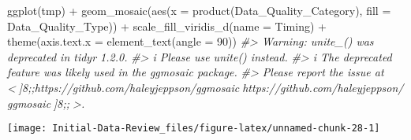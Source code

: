 \documentclass[
]{article}
\newenvironment{Shaded}{\begin{snugshade}}{\end{snugshade}}
\newcommand{\AttributeTok}[1]{\textcolor[rgb]{0.77,0.63,0.00}{#1}}
\newcommand{\CommentTok}[1]{\textcolor[rgb]{0.56,0.35,0.01}{\textit{#1}}}
\newcommand{\DecValTok}[1]{\textcolor[rgb]{0.00,0.00,0.81}{#1}}
\newcommand{\FunctionTok}[1]{\textcolor[rgb]{0.00,0.00,0.00}{#1}}
\newcommand{\NormalTok}[1]{#1}
\newcommand{\SpecialCharTok}[1]{\textcolor[rgb]{0.00,0.00,0.00}{#1}}
\newcommand{\StringTok}[1]{\textcolor[rgb]{0.31,0.60,0.02}{#1}}
\begin{document}
\begin{Shaded}
\begin{Highlighting}[]
\FunctionTok{ggplot}\NormalTok{(tmp) }\SpecialCharTok{+}
  \FunctionTok{geom\_mosaic}\NormalTok{(}\FunctionTok{aes}\NormalTok{(}\AttributeTok{x =} \FunctionTok{product}\NormalTok{(Data\_Quality\_Category), }
                  \AttributeTok{fill =}\NormalTok{ Data\_Quality\_Type)) }\SpecialCharTok{+}
  \FunctionTok{scale\_fill\_viridis\_d}\NormalTok{(}\AttributeTok{name =} \StringTok{\textquotesingle{}Timing\textquotesingle{}}\NormalTok{) }\SpecialCharTok{+}
    \FunctionTok{theme}\NormalTok{(}\AttributeTok{axis.text.x =} \FunctionTok{element\_text}\NormalTok{(}\AttributeTok{angle =} \DecValTok{90}\NormalTok{))}
\CommentTok{\#\textgreater{} Warning: \textasciigrave{}unite\_()\textasciigrave{} was deprecated in tidyr 1.2.0.}
\CommentTok{\#\textgreater{} i Please use \textasciigrave{}unite()\textasciigrave{} instead.}
\CommentTok{\#\textgreater{} i The deprecated feature was likely used in the ggmosaic package.}
\CommentTok{\#\textgreater{}   Please report the issue at \textless{}]8;;https://github.com/haleyjeppson/ggmosaichttps://github.com/haleyjeppson/ggmosaic]8;;\textgreater{}.}
\end{Highlighting}
\end{Shaded}

\begin{center}\texttt{[image: Initial-Data-Review\_files/figure-latex/unnamed-chunk-28-1]} \end{center}

\begin{Shaded}
\end{Shaded}
\end{document}
